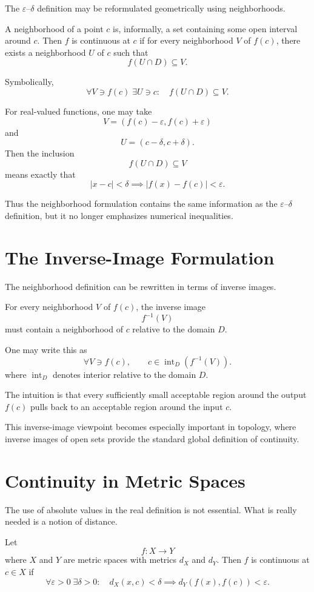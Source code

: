 \documentclass{essay}
\begin{document}
The $\varepsilon$--$\delta$ definition may be reformulated geometrically using neighborhoods.

A neighborhood of a point $c$ is, informally, a set containing some open interval around $c$. Then $f$ is continuous at $c$ if for every neighborhood $V$ of $f(c)$, there exists a neighborhood $U$ of $c$ such that
\[
f(U\cap D)\subseteq V.
\]

Symbolically,
\[
\boxed{
\forall V\ni f(c)\;\exists U\ni c:
\quad
f(U\cap D)\subseteq V.
}
\]

For real-valued functions, one may take
\[
V=(f(c)-\varepsilon,f(c)+\varepsilon)
\]
and
\[
U=(c-\delta,c+\delta).
\]
Then the inclusion
\[
f(U\cap D)\subseteq V
\]
means exactly that
\[
|x-c|<\delta
\implies
|f(x)-f(c)|<\varepsilon.
\]

Thus the neighborhood formulation contains the same information as the $\varepsilon$--$\delta$ definition, but it no longer emphasizes numerical inequalities.

\section{The Inverse-Image Formulation}

The neighborhood definition can be rewritten in terms of inverse images.

For every neighborhood $V$ of $f(c)$, the inverse image
\[
f^{-1}(V)
\]
must contain a neighborhood of $c$ relative to the domain $D$.

One may write this as
\[
\boxed{
\forall V\ni f(c),
\qquad
c\in \operatorname{int}_D(f^{-1}(V)).
}
\]
where $\operatorname{int}_D$ denotes interior relative to the domain $D$.

The intuition is that every sufficiently small acceptable region around the output $f(c)$ pulls back to an acceptable region around the input $c$.

This inverse-image viewpoint becomes especially important in topology, where inverse images of open sets provide the standard global definition of continuity.

\section{Continuity in Metric Spaces}

The use of absolute values in the real definition is not essential. What is really needed is a notion of distance.

Let
\[
f:X\to Y
\]
where $X$ and $Y$ are metric spaces with metrics $d_X$ and $d_Y$. Then $f$ is continuous at $c\in X$ if
\[
\boxed{
\forall\varepsilon>0\;\exists\delta>0:
\quad
d_X(x,c)<\delta
\implies
d_Y(f(x),f(c))<\varepsilon.
}
\]
\end{document}
